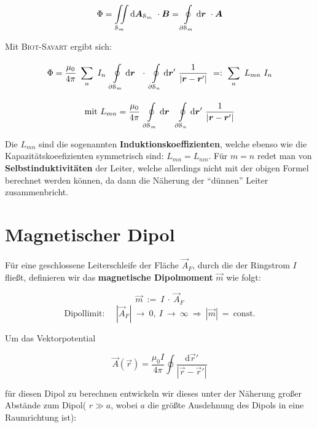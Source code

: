 \begin{equation*}
\Phi = \iint\limits_{{\mathcal{S}_m}}^{{}}\mathrm{d}{\bm{A}_{\mathcal{S}_m}}\ \cdot\bm{B} = \oint\limits_{{\partial\mathcal{S}_m}}^{{}}\mathrm{d}{\bm{r}}\ \cdot\bm{A}
\end{equation*}

\newpage
Mit \textsc{Biot-Savart} ergibt sich:

\begin{equation*}
\Phi = \frac{\mu_0}{4\pi}\ \sum_n \ I_n \ \Oint{\partial\mathcal{S}_m}{}{\vec{r}}\ \cdot \ \Oint{\partial\mathcal{S}_n}{}{\vec{r}'}\frac{1}{|\vec{r}-\vec{r}'|} \ =: \ \sum_n \ L_{mn} \ I_n
\end{equation*}

\begin{equation*}
\text{mit } L_{mn} = \frac{\mu_0}{4\pi} \ \Oint{\partial\mathcal{S}_m}{}{\vec{r}}\ \Oint{\partial\mathcal{S}_n}{}{\vec{r}'}\frac{1}{|\vec{r}-\vec{r}'|}
\end{equation*}

Die $L_{mn}$ sind die sogenannten \textbf{Induktionskoeffizienten}, welche ebenso wie die Kapazitätskoeefizienten symmetrisch sind: $L_{mn} = L_{nm}$. Für $m=n$ redet man von \textbf{Selbstinduktivitäten} der Leiter, welche allerdings  nicht mit der obigen Formel berechnet werden können, da dann die Näherung der "`dünnen"' Leiter zusammenbricht.

\section{Magnetischer Dipol}

Für eine geschlossene Leiterschleife der Fläche $\vec{A}_F$, durch die der Ringstrom $I$ fließt, definieren wir das \textbf{magnetische Dipolmoment} $\vec{m}$ wie folgt:

\begin{equation*}
\vec{m} \ := \ I \ \cdot \ \vec{A}_F
\end{equation*}
\begin{equation*}
\text{Dipollimit: } \quad |\vec{A}_F| \ \rightarrow \ 0, \ I \ \rightarrow \ \infty \ \Rightarrow \ |\vec{m}| \ = \ \text{const.}
\end{equation*}

Um das Vektorpotential

\begin{equation*}
\vec{A}(\vec{r}) = \frac{\mu_0 I}{4\pi}\oint\frac{\mathrm{d}\vec{r}'}{|\vec{r}-\vec{r}'|}
\end{equation*}

für diesen Dipol zu berechnen entwickeln wir dieses unter der Näherung großer Abstände zum Dipol( $r\gg a$, wobei $a$ die größte Ausdehnung des Dipols in eine Raumrichtung ist):

